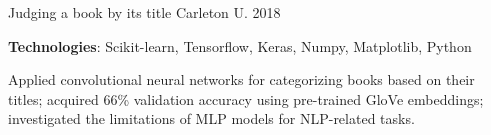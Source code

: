 \begin{cventries}

\cventry
{\textnormal{}}
{Judging a book by its title}
{Carleton U.}
{2018}
{\begin{cvitems}
    \item {\textbf{Technologies}: Scikit-learn, Tensorflow, Keras, Numpy, Matplotlib, Python}
    \item {Applied convolutional neural networks for categorizing books based on their titles; acquired 66\% validation accuracy using pre-trained GloVe embeddings; investigated the limitations of MLP models for NLP-related tasks.}
\end{cvitems}}




\end{cventries}
